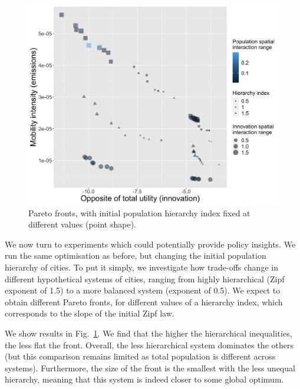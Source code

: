 \documentclass[final,5p,times,twocolumn,authoryear]{elsarticle}
\begin{document}



\begin{figure}
	\centering
	\includegraphics[width=\linewidth]{figures/Fig2.png}
	\caption{Pareto fronts, with initial population hierarchy index fixed at different values (point shape).\label{fig:fig2}}
\end{figure}


We now turn to experiments which could potentially provide policy insights. We run the same optimisation as before, but changing the initial population hierarchy of cities. To put it simply, we investigate how trade-offs change in different hypothetical systems of cities, ranging from highly hierarchical (Zipf exponent of 1.5) to a more balanced system (exponent of 0.5). We expect to obtain different Pareto fronts, for different values of a hierarchy index, which corresponds to the slope of the initial Zipf law.

We show results in Fig.~\ref{fig:fig2}. We find that the higher the hierarchical inequalities, the less flat the front. Overall, the less hierarchical system dominates the others (but this comparison remains limited as total population is different across systems). Furthermore, the size of the front is the smallest with the less unequal hierarchy, meaning that this system is indeed closer to some global optimum.
\end{document}
